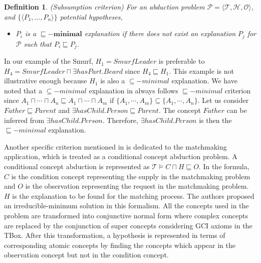\documentclass{article}
\newtheorem{mydef}{Definition}
\begin{document}
 \begin{mydef}{(Subsumption criterion)}
For an abduction problem $\mathcal{P}=\langle \mathcal{T},\mathcal{H}, \mathcal{O}\rangle$, and $\{\langle P_{1},\dots,P_{n}\rangle\}$ potential hypotheses,
\begin{itemize}
\item  $P_{i}$ is a $\bm{\sqsubseteq -minimal}$ explanation if there does not exist an explanation $P_{j}$ for $\mathcal{P}$ such that $P_{i}\sqsubseteq P_{j}$.
\end{itemize}
\end{mydef}
In our example of the Smurf, $H_1=SmurfLeader$ is preferable to $H_4=SmurfLeader\sqcap \exists hasPart.Beard$ since $H_4\sqsubseteq H_1$.
This example is not illustrative enough because $H_1$ is also a $\subseteq-minimal$ explanation.
We have noted that a $\subseteq-minimal$ explanation in \cite{bienvenu08complexity} always follows $\sqsubseteq-minimal$ criterion since 
$A_1\sqcap \cdots\sqcap A_n\sqsubseteq A_1\sqcap \cdots\sqcap A_m$ if $\{A_1, \cdots, A_m\}\subseteq \{A_1, \cdots, A_n\}$.
Let us consider $Father \sqsubseteq Parent$ and $\exists hasChild.Person \sqsubseteq Parent$. The concept $Father$ can be inferred from $\exists hasChild.Person$.
Therefore, $\exists hasChild.Person$ is then the $\sqsubseteq-minimal$ explanation. 


Another specific criterion mentioned in \cite{di2007semantic} is dedicated to the matchmaking application, which is treated as a conditional concept abduction problem.
A conditional concept abduction is represented as $\mathcal{T}\vDash C\sqcap H\sqsubseteq O$. 
In the formula, $C$ is the condition concept representing the supply in the matchmaking problem and $O$ is the observation representing the request in the matchmaking problem.
$H$ is the explanation to be found for the matching process.
The authors proposed an irreducible-minimum solution in this formalism.
All the concepts used in the problem are transformed into conjunctive normal form where complex concepts are replaced by the conjunction of super concepts considering GCI axioms in the TBox.
After this transformation, a hypothesis is represented in terms of corresponding atomic concepts by finding the concepts which appear in the observation concept but not in the condition concept.
\end{document}
